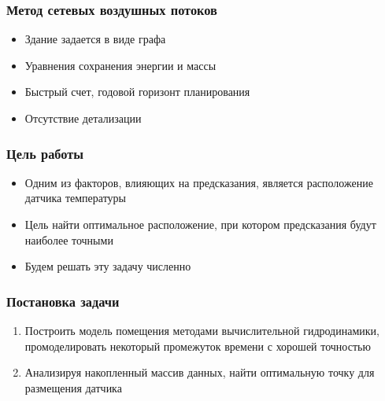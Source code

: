 \documentclass[14pt,aspectratio=169,hyperref={pdftex,unicode},xcolor=dvipsnames]{beamer}
\begin{document}
\begin{frame}
\frametitle{Метод сетевых воздушных потоков}

\begin{itemize}
\item Здание задается в виде графа
\item Уравнения сохранения энергии и массы
\item Быстрый счет, годовой горизонт планирования
\item Отсутствие детализации
\end{itemize}

\end{frame}




\begin{frame}
\frametitle{Цель работы}

\begin{itemize}
\item Одним из факторов, влияющих на предсказания, является расположение датчика температуры
\item Цель найти оптимальное расположение, при котором предсказания будут наиболее точными
\item Будем решать эту задачу численно
\end{itemize}

\end{frame}



\begin{frame}
\frametitle{Постановка задачи}
\begin{enumerate}
\item Построить модель помещения методами вычислительной гидродинамики, промоделировать некоторый промежуток времени с хорошей точностью
\item Анализируя накопленный массив данных, найти оптимальную точку для размещения датчика
\end{enumerate}
\end{frame}
\end{document}
